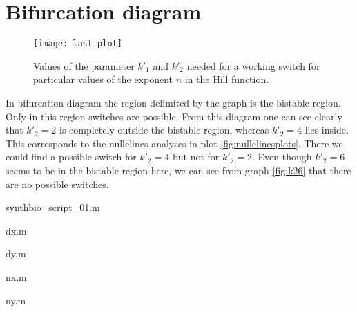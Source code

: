 \section{Bifurcation diagram}


\begin{figure}[h]
 \centering
    \texttt{[image: last\_plot]}
    \caption{Values of the parameter $k'_1$ and $k'_2$ needed for a working
    switch
for particular values of the exponent $n$ in the Hill function.}
	\label{fig:bifurcatingplot}
\end{figure}
 
 
 In bifurcation diagram the region delimited by the graph is the bistable
 region. Only in this region switches are possible. From this diagram one can
 see clearly that $k'_2 = 2$ is completely outside the bistable region,
 whereas $k'_2 = 4$ lies inside. This corresponds to the nullclines analyses in
 plot \ref{fig:nullclinesplots}. There we could find a possible switch for $k'_2=4$ but not
 for $k'_2 = 2$. Even though $k'_2 = 6$ seems to be in the bistable region here,
 we can see from graph \ref{fig:k26} that there are no possible switches.

\newpage

\begin{section}{synthbio\_script\_01.m}

\end{section}
\begin{section}{dx.m}

\end{section}
\begin{section}{dy.m}

\end{section}
\begin{section}{nx.m}

\end{section}
\begin{section}{ny.m}

\end{section}
